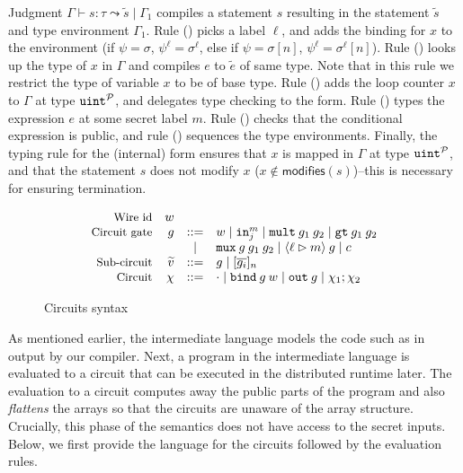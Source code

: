 Judgment $\Gamma \vdash s : \tau \leadsto \widetilde{s} \mid \Gamma_{1}$
compiles a statement $s$ resulting in the statement $\widetilde{s}$
and type environment $\Gamma_{1}$. Rule ({}) picks a label
$\ell$, and adds the binding for $x$ to the environment (if $\psi =
\sigma$, $\psi^\ell = \sigma^\ell$, else if $\psi = \sigma[n]$,
$\psi^\ell = \sigma^\ell[n]$).
Rule ({}) looks up the type of $x$ in $\Gamma$ and compiles $e$ to $\tilde{e}$ of same type.
Note that in this rule we restrict the type of variable $x$ to be of base type.
Rule ({}) adds the loop counter $x$ to $\Gamma$ at type
${\mathtt{uint}}^{\mathcal{P}}$, and delegates type checking to the
 form. Rule ({})
types the expression $e$ at some secret label $m$. Rule ({})
checks that the conditional expression is public, and rule
({}) sequences the type environments. Finally, the typing
rule for the (internal)  form ensures that $x$ is mapped in
$\Gamma$ at type ${\mathtt{uint}}^{\mathcal{P}}$, and that the statement $s$
does not modify $x$ ($x \notin
\mathsf{modifies}(s)$)--this is necessary for ensuring termination.


\begin{figure}
  \footnotesize
  \[
  \begin{array}{rrcl}
    \text{\small{Wire id}} & w &&\\
    \text{\small{Circuit gate}} & {g} & ::= & w \mid {\ensuremath{\mathtt{in}}}^{m}_{j} \mid {\ensuremath{\mathtt{mult}}}\:{g}_1\:{g}_{2} \mid {\ensuremath{\mathtt{gt}}}\:{g}_{1}\:{g}_{2}\\
    & & \mid & {\mathtt{mux}}\:{g}\:{g}_{1}\:{g}_{2} \mid \langle \ell
    \rhd m \rangle\:{g} \mid c\\
    \text{\small{Sub-circuit}} & \widetilde{v} & ::= & {g} \mid [\overline{{g}_{i}}]_{n}\\
    \text{\small{Circuit}} & \chi & ::= & \cdot \mid {\ensuremath{\mathtt{bind}}}\:{g}\:w \mid {\ensuremath{\mathtt{out}}}\:{g} \mid \chi_{1}; \chi_{2}
  \end{array}
  \]
\caption{Circuits  syntax}
\label{fig:circuits}
\end{figure}

As mentioned earlier, the intermediate language models the code such
as in  output by our compiler.
Next, a program in the intermediate language is evaluated to a circuit
that can be executed in the distributed runtime later. The evaluation
to a circuit computes away the public parts of the program and also
\emph{flattens} the arrays so that the circuits are unaware of the
array structure.
Crucially, this phase of the semantics does not have access to the
secret inputs.
Below, we first provide the language for the circuits followed by the
evaluation rules.

